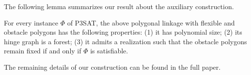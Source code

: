 \documentclass[runningheads]{article}
\newcommand{\PP}{{\cal P}} %
\begin{document}
The following lemma summarizes our result about the auxiliary construction.
\begin{lemma}\label{lem:aux}
For every instance $\Phi$ of P3SAT, the above polygonal linkage with flexible and obstacle polygons
has the following properties: (1) it has polynomial size; (2) its hinge graph is a forest;
(3) it admits a realization such that the obstacle polygons remain fixed if and only if $\Phi$ is satisfiable.
\end{lemma}
The remaining details of our construction can be found in the full paper.%
%
%
%
\end{document}
